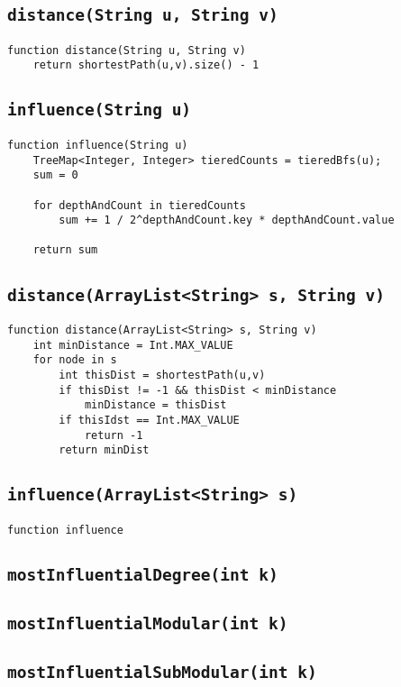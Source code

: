 \documentclass[10pt,letterpaper]{article}
\begin{document}
\subsection{\texttt{distance(String u, String v)}}
\begin{verbatim}
function distance(String u, String v) 
   	return shortestPath(u,v).size() - 1
\end{verbatim}
\subsection{\texttt{influence(String u) }}
\begin{verbatim}
function influence(String u)
	TreeMap<Integer, Integer> tieredCounts = tieredBfs(u);
	sum = 0
	
	for depthAndCount in tieredCounts
		sum += 1 / 2^depthAndCount.key * depthAndCount.value
		
	return sum
\end{verbatim}	
\subsection{\texttt{distance(ArrayList<String> s, String v)}}
\begin{verbatim}
function distance(ArrayList<String> s, String v) 
    int minDistance = Int.MAX_VALUE
    for node in s
        int thisDist = shortestPath(u,v)
        if thisDist != -1 && thisDist < minDistance
            minDistance = thisDist
        if thisIdst == Int.MAX_VALUE
            return -1
        return minDist
\end{verbatim}
\subsection{\texttt{influence(ArrayList<String> s)}}
\begin{verbatim}
function influence
\end{verbatim}
\subsection{\texttt{mostInfluentialDegree(int k)}}
\subsection{\texttt{mostInfluentialModular(int k)}}
\subsection{\texttt{mostInfluentialSubModular(int k)}}
\end{document}
